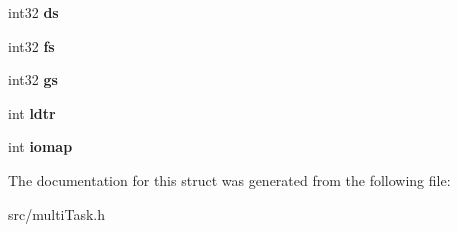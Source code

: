 \begin{DoxyCompactItemize}
\item 
\hypertarget{struct_t_s_s32_accbe447e9c8ef5d52a61e99514f5c008}{}int32 {\bfseries ds}\label{struct_t_s_s32_accbe447e9c8ef5d52a61e99514f5c008}

\item 
\hypertarget{struct_t_s_s32_a346e9fe88b4eabb56fe2b7367472cde7}{}int32 {\bfseries fs}\label{struct_t_s_s32_a346e9fe88b4eabb56fe2b7367472cde7}

\item 
\hypertarget{struct_t_s_s32_a357de79d0e6bf44cdc246dc5025dfdd7}{}int32 {\bfseries gs}\label{struct_t_s_s32_a357de79d0e6bf44cdc246dc5025dfdd7}

\item 
\hypertarget{struct_t_s_s32_a1a5cd05e4d25247ee8922336f48d3b88}{}int {\bfseries ldtr}\label{struct_t_s_s32_a1a5cd05e4d25247ee8922336f48d3b88}

\item 
\hypertarget{struct_t_s_s32_a499877cd623440298897bee4999cc06f}{}int {\bfseries iomap}\label{struct_t_s_s32_a499877cd623440298897bee4999cc06f}

\end{DoxyCompactItemize}


The documentation for this struct was generated from the following file\+:\begin{DoxyCompactItemize}
\item 
src/multi\+Task.\+h\end{DoxyCompactItemize}
